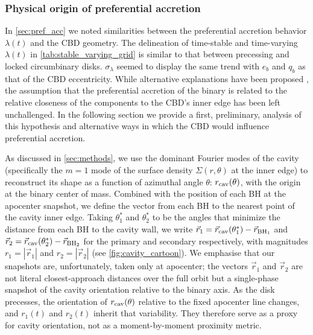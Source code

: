 \documentclass[fleqn,usenatbib]{mnras}
\begin{document}
\subsubsection{Physical origin of preferential accretion}\label{sec:preliminary_analysis}

In \autoref{sec:pref_acc} we noted similarities between the preferential accretion behavior $\lambda(t)$ and the CBD geometry. The delineation of time-stable and time-varying $\lambda(t)$ in \autoref{tab:stable_varying_grid} is similar to that between precessing and locked circumbinary disks. $\sigma_{\lambda}$ seemed to display the same trend with $e_b$ and $q_b$ as that of the CBD eccentricity. While alternative explanations have been proposed \citep{Artimowicz_83_og_polish}, the assumption that the preferential accretion of the binary is related to the relative closeness of the components to the CBD's inner edge \citep{Rafikov_16_accretion, farris_2014} has been left unchallenged. In the following section we provide a first, preliminary, analysis of this hypothesis and alternative ways in which the CBD would influence preferential accretion.



As discussed in \autoref{sec:methods}, we use the dominant Fourier modes of the cavity (specifically the $m=1$ mode of the surface density $\Sigma(r,\theta)$ at the inner edge) to reconstruct its shape as a function of azimuthal angle $\theta$: $r_{\rm cav}(\theta)$, with the origin at the binary center of mass. Combined with the position of each BH at the apocenter snapshot, we define the vector from each BH to the nearest point of the cavity inner edge. Taking $\theta_1^*$ and $\theta_2^*$ to be the angles that minimize the distance from each BH to the cavity wall, we write $\vec{r}_1 = \vec{r}_{\rm cav}(\theta_1^*) - \vec{r}_{\rm BH_1}$ and $\vec{r}_2 = \vec{r}_{\rm cav}(\theta_2^*) - \vec{r}_{\rm BH_2}$ for the primary and secondary respectively, with magnitudes $r_1 = |\vec{r}_1|$ and $r_2 = |\vec{r}_2|$ (see \autoref{fig:cavity_cartoon}). We emphasise that our snapshots are, unfortunately, taken only at apocenter; the vectors $\vec{r}_1$ and $\vec{r}_2$ are not literal closest-approach distances over the full orbit but a single-phase snapshot of the cavity orientation relative to the binary axis. As the disk precesses, the orientation of $r_{\rm cav}(\theta)$ relative to the fixed apocenter line changes, and $r_1(t)$ and $r_2(t)$ inherit that variability. They therefore serve as a proxy for cavity orientation, not as a moment-by-moment proximity metric.
\end{document}
